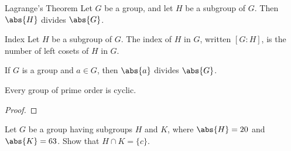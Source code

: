 \begin{thmbox}{Lagrange's Theorem}{}
    Let $G$ be a group, and let $H$ be a subgroup of $G$. Then $\abs{H}$ divides $\abs{G}$.
\end{thmbox}

\begin{dfnbox}{Index}{}
    Let $H$ be a subgroup of $G$. The index of $H$ in $G$, written $[G : H]$, is the number of left cosets of $H$ in $G$.
\end{dfnbox}

\begin{corbox}{}{}
    If $G$ is a group and $a \in G$, then $\abs{a}$ divides $\abs{G}$.
\end{corbox}

\begin{corbox}{}{}
    Every group of prime order is cyclic.
    \tcblower
    \begin{proof}

    \end{proof}
\end{corbox}

\begin{exbox}{}{}
    Let $G$ be a group having subgroups $H$ and $K$, where $\abs{H} = 20$ and $\abs{K} = 63$. Show that $H \cap K = \{ c \}$.
\end{exbox}
